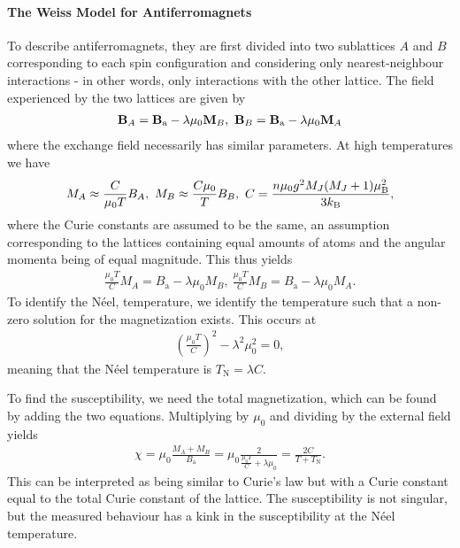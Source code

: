 \paragraph{The Weiss Model for Antiferromagnets}
To describe antiferromagnets, they are first divided into two sublattices $A$ and $B$ corresponding to each spin configuration and considering only nearest-neighbour interactions - in other words, only interactions with the other lattice. The field experienced by the two lattices are given by
\begin{align*}
	\vb{B}_{A} = \vb{B}_{\text{a}} - \lambda\mu_{0}\vb{M}_{B},\ \vb{B}_{B} = \vb{B}_{\text{a}} - \lambda\mu_{0}\vb{M}_{A}
\end{align*}
where the exchange field necessarily has similar parameters. At high temperatures we have
\begin{align*}
	M_{A} \approx \frac{C}{\mu_{0}T}B_{A},\ M_{B} \approx \frac{C\mu_{0}}{T}B_{B},\ C = \frac{n\mu_{0}g^{2}M_{J}(M_{J} + 1)\mu_{\text{B}}^{2}}{3k_{\text{B}}},
\end{align*}
where the Curie constants are assumed to be the same, an assumption corresponding to the lattices containing equal amounts of atoms and the angular momenta being of equal magnitude. This thus yields
\begin{align*}
	\frac{\mu_{0}T}{C}M_{A} = B_{\text{a}} - \lambda\mu_{0}M_{B},\ \frac{\mu_{0}T}{C}M_{B} = B_{\text{a}} - \lambda\mu_{0}M_{A}.
\end{align*}
To identify the Néel, temperature, we identify the temperature such that a non-zero solution for the magnetization exists. This occurs at
\begin{align*}
	\left(\frac{\mu_{0}T}{C}\right)^{2} - \lambda^{2}\mu_{0}^{2} = 0,
\end{align*}
meaning that the Néel temperature is $T_{\text{N}} = \lambda C$.

To find the susceptibility, we need the total magnetization, which can be found by adding the two equations. Multiplying by $\mu_{0}$ and dividing by the external field yields
\begin{align*}
	\chi = \mu_{0}\frac{M_{A} + M_{B}}{B_{\text{a}}} = \mu_{0}\frac{2}{\frac{\mu_{0}T}{C} + \lambda\mu_{0}} = \frac{2C}{T + T_{\text{N}}}.
\end{align*}
This can be interpreted as being similar to Curie's law but with a Curie constant equal to the total Curie constant of the lattice. The susceptibility is not singular, but the measured behaviour has a kink in the susceptibility at the Néel temperature.